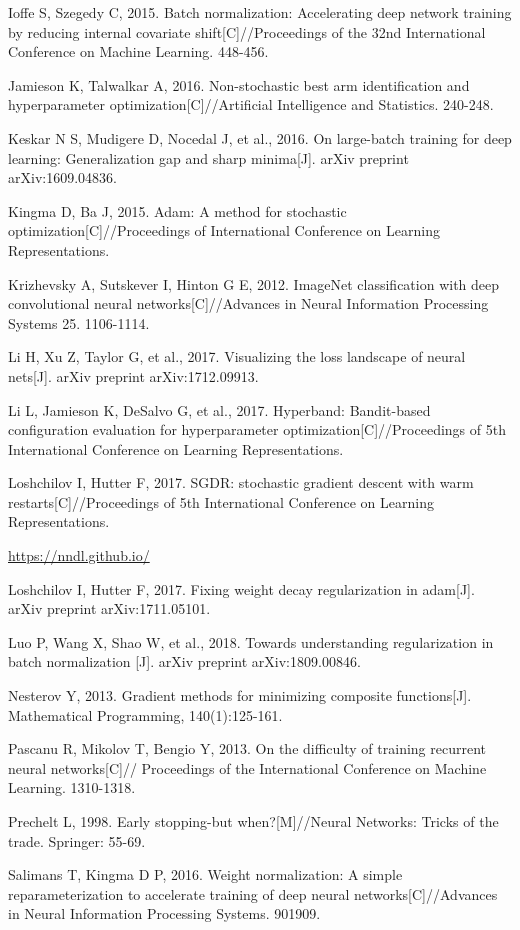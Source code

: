 \documentclass[10pt]{article}
\begin{document}
Ioffe S, Szegedy C, 2015. Batch normalization: Accelerating deep network training by reducing internal covariate shift[C]//Proceedings of the 32nd International Conference on Machine Learning. 448-456.

Jamieson K, Talwalkar A, 2016. Non-stochastic best arm identification and hyperparameter optimization[C]//Artificial Intelligence and Statistics. 240-248.

Keskar N S, Mudigere D, Nocedal J, et al., 2016. On large-batch training for deep learning: Generalization gap and sharp minima[J]. arXiv preprint arXiv:1609.04836.

Kingma D, Ba J, 2015. Adam: A method for stochastic optimization[C]//Proceedings of International Conference on Learning Representations.

Krizhevsky A, Sutskever I, Hinton G E, 2012. ImageNet classification with deep convolutional neural networks[C]//Advances in Neural Information Processing Systems 25. 1106-1114.

Li H, Xu Z, Taylor G, et al., 2017. Visualizing the loss landscape of neural nets[J]. arXiv preprint arXiv:1712.09913.

Li L, Jamieson K, DeSalvo G, et al., 2017. Hyperband: Bandit-based configuration evaluation for hyperparameter optimization[C]//Proceedings of 5th International Conference on Learning Representations.

Loshchilov I, Hutter F, 2017. SGDR: stochastic gradient descent with warm restarts[C]//Proceedings of 5th International Conference on Learning Representations.

\href{https://nndl.github.io/}{https://nndl.github.io/}

Loshchilov I, Hutter F, 2017. Fixing weight decay regularization in adam[J]. arXiv preprint arXiv:1711.05101.

Luo P, Wang X, Shao W, et al., 2018. Towards understanding regularization in batch normalization [J]. arXiv preprint arXiv:1809.00846.

Nesterov Y, 2013. Gradient methods for minimizing composite functions[J]. Mathematical Programming, 140(1):125-161.

Pascanu R, Mikolov T, Bengio Y, 2013. On the difficulty of training recurrent neural networks[C]// Proceedings of the International Conference on Machine Learning. 1310-1318.

Prechelt L, 1998. Early stopping-but when?[M]//Neural Networks: Tricks of the trade. Springer: 55-69.

Salimans T, Kingma D P, 2016. Weight normalization: A simple reparameterization to accelerate training of deep neural networks[C]//Advances in Neural Information Processing Systems. 901909.
\end{document}
